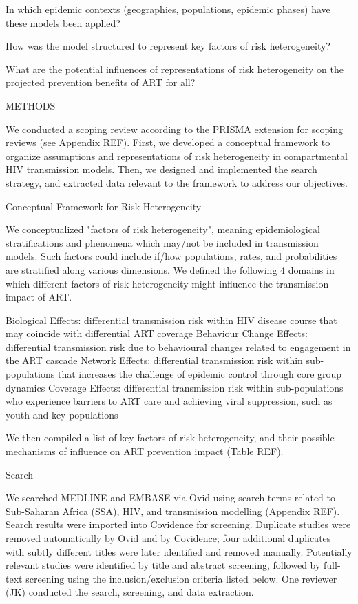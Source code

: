       In which epidemic contexts (geographies, populations, epidemic phases)
      have these models been applied?

      How was the model structured to represent key factors of risk heterogeneity?

      What are the potential influences of representations of risk heterogeneity
      on the projected prevention benefits of ART for all?

METHODS

We conducted a scoping review according to the PRISMA extension for scoping reviews
(see Appendix REF).
First, we developed a conceptual framework to organize
assumptions and representations of risk heterogeneity
in compartmental HIV transmission models.
Then, we designed and implemented the search strategy,
and extracted data relevant to the framework to address our objectives.

Conceptual Framework for Risk Heterogeneity

We conceptualized "factors of risk heterogeneity", meaning
epidemiological stratifications and phenomena which may/not be included in transmission models.
Such factors could include if/how populations, rates, and probabilities
are stratified along various dimensions.
We defined the following 4 domains in which
different factors of risk heterogeneity might influence the transmission impact of ART.

   Biological Effects:
  differential transmission risk within HIV disease course
  that may coincide with differential ART coverage
   Behaviour Change Effects:
  differential transmission risk due to
  behavioural changes related to engagement in the ART cascade
   Network Effects:
  differential transmission risk within sub-populations
  that increases the challenge of epidemic control through core group dynamics
   Coverage Effects:
  differential transmission risk within sub-populations
  who experience barriers to ART care and achieving viral suppression,
  such as youth and key populations

We then compiled a list of key factors of risk heterogeneity,
and their possible mechanisms of influence on ART prevention impact (Table REF).

Search

We searched MEDLINE and EMBASE via Ovid
using search terms related to Sub-Saharan Africa (SSA), HIV, and transmission modelling
(Appendix REF).
Search results were imported into Covidence for screening.
Duplicate studies were removed automatically by Ovid and by Covidence;
four additional duplicates with subtly different titles were later identified and removed manually.
Potentially relevant studies were identified by title and abstract screening, followed 
by full-text screening using the inclusion/exclusion criteria listed below. 
One reviewer (JK) conducted the search, screening, and data extraction.

